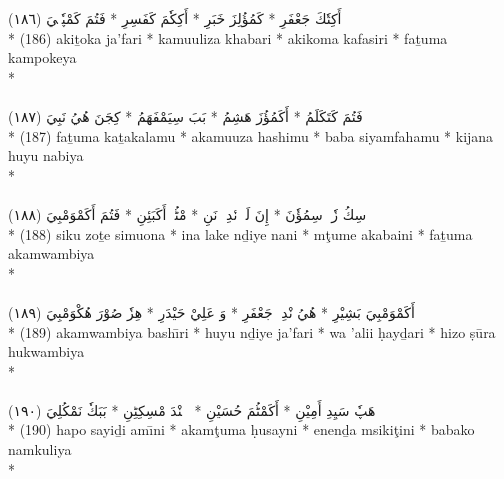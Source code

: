 \documentclass[a4paper, 12pt]{report}
\begin{document}
\begin{center}
\textarabic{(١٨٦) \textcolor{mygreen}{أَكِتٗكَ جَعْفَرِ  * كَمُؤُلِزَ خَبَرِ  * أَكِكٗمَ كَفَسِرِ  * فَتُمَ كَمْپٗكٖيَ }} \\* 
(186) akiṯoka ja'fari  * kamuuliza khabari  * akikoma kafasiri  * faṯuma kampokeya  \\* 
 \\ 
\\[8mm] 

\textarabic{(١٨٧) \textcolor{mygreen}{فَتُمَ كَتَكَلَمُ  * أَكَمُؤُزَ هَشِمُ  * بَبَ سِيَمْفَهَمُ  * كِجَنَ هُيُ نَبِيَ }} \\* 
(187) faṯuma kaṯakalamu  * akamuuza hashimu  * baba siyamfahamu  * kijana huyu nabiya  \\* 
 \\ 
\\[8mm] 

\textarabic{(١٨٨) \textcolor{mygreen}{سِكُ زٗتٖ سِمُؤٗنَ  * إِنَ لَكٖ نٔدِيٖ نَنِ  * مْٹُمٖ أَكَبَئِنِ  * فَتُمَ أَكَمْوَمْبِيَ }} \\* 
(188) siku zoṯe simuona  * ina lake nḏiye nani  * mţume akabaini  * faṯuma akamwambiya  \\* 
 \\ 
\\[8mm] 

\textarabic{(١٨٩) \textcolor{mygreen}{أَكَمْوَمْبِيَ بَشِيْرِ  * هُيُ نْدِيٖ جَعْفَرِ  * وَ عَلِيْ حَيْدَرِ  * هِزٗ صُوْرَ هُكْوَمْبِيَ }} \\* 
(189) akamwambiya bashı̄ri  * huyu nḏiye ja'fari  * wa 'alii ḥayḏari  * hizo ṣūra hukwambiya  \\* 
 \\ 
\\[8mm] 

\textarabic{(١٩٠) \textcolor{mygreen}{هَپٗ سَيِدِ أَمِيْنِ  * أَكَمْٹُمَ حُسَيْنِ  * إٖنٖنْدَ مْسِكِٹِنِ  * بَبَكٗ نَمْكُلِيَ }} \\* 
(190) hapo sayiḏi amı̄ni  * akamţuma ḥusayni  * enenḏa msikiţini  * babako namkuliya  \\* 
 \\ 
\\[8mm] 


\end{center}
\end{document}
